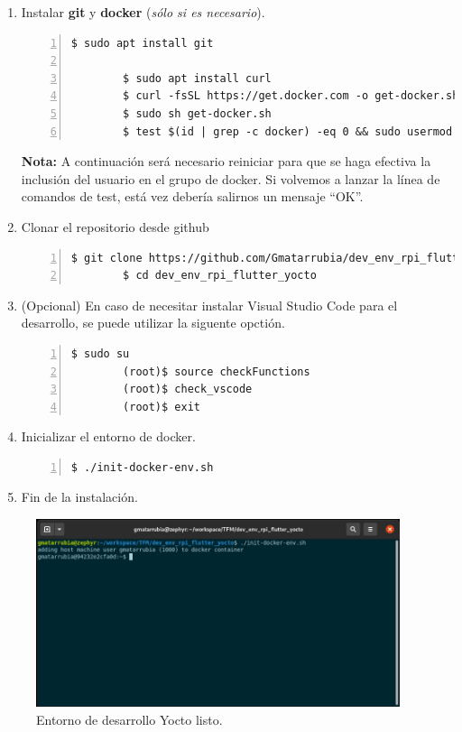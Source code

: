 \begin{enumerate}
    \item Instalar \textbf{\gls{git}} y \textbf{docker} (\emph{sólo si es necesario}).
    \begin{lstlisting}[style=consola, numbers=left]
        $ sudo apt install git

        $ sudo apt install curl
        $ curl -fsSL https://get.docker.com -o get-docker.sh
        $ sudo sh get-docker.sh
        $ test $(id | grep -c docker) -eq 0 && sudo usermod -aG docker $(whoami) || echo "OK"
    \end{lstlisting}
    \textbf{Nota:} A continuación será necesario reiniciar para que se haga efectiva la
    inclusión del usuario en el grupo de docker. Si volvemos a lanzar la línea de
    comandos de test, está vez debería salirnos un mensaje ``OK''.

    \item Clonar el repositorio desde github
    \begin{lstlisting}[style=consola, numbers=left]
        $ git clone https://github.com/Gmatarrubia/dev_env_rpi_flutter_yocto.git
        $ cd dev_env_rpi_flutter_yocto
    \end{lstlisting}

    \item (Opcional) En caso de necesitar instalar Visual Studio Code para el desarrollo,
    se puede utilizar la siguente opctión.
    \begin{lstlisting}[style=consola, numbers=left]
        $ sudo su
        (root)$ source checkFunctions
        (root)$ check_vscode
        (root)$ exit
    \end{lstlisting}

    \item Inicializar el entorno de docker.
    \begin{lstlisting}[style=consola, numbers=left]
        $ ./init-docker-env.sh
    \end{lstlisting}

    \item Fin de la instalación.
\end{enumerate}

\begin{figure}[H]
    \centering
    \includegraphics[width=0.95\textwidth]{imgs/yocto-docker-ready}
    \caption[yocto docker ready]{Entorno de desarrollo Yocto listo.}
    \label{imgs:yocto-docker-ready}
\end{figure}

